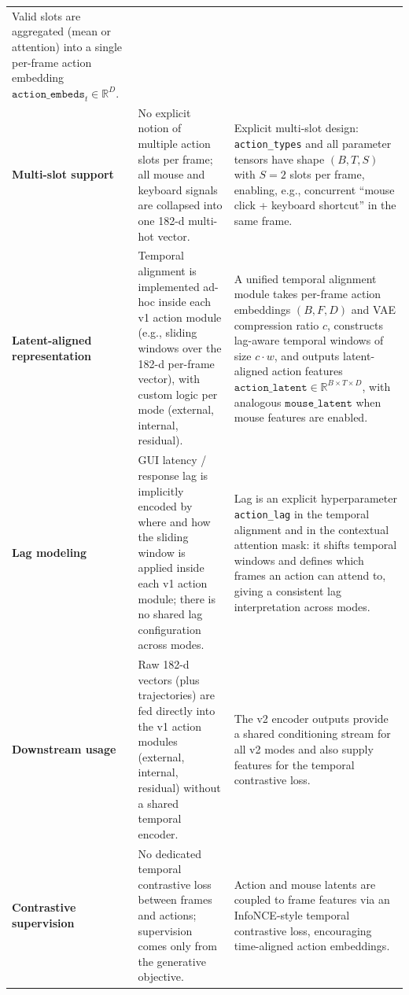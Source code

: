 \begin{table}[h!]
\begin{tabularx}{\linewidth}{p{2.9cm} >{\raggedright\arraybackslash}X >{\raggedright\arraybackslash}X}
    Valid slots are aggregated (mean or attention) into a single
    per-frame action embedding
    $\texttt{action\_embeds}_{t} \in \mathbb{R}^{D}$. \\[2pt]
    \textbf{Multi-slot support} &
    No explicit notion of multiple action slots per frame;
    all mouse and keyboard signals are collapsed into one
    182-d multi-hot vector. &
    Explicit multi-slot design:
    \texttt{action\_types} and all parameter tensors have shape
    $(B, T, S)$ with $S=2$ slots per frame,
    enabling, e.g., concurrent ``mouse click + keyboard shortcut''
    in the same frame. \\[2pt]
    \textbf{Latent-aligned representation} &
    Temporal alignment is implemented ad-hoc inside each
    v1 action module (e.g., sliding windows over the
    182-d per-frame vector),
    with custom logic per mode (external, internal, residual). &
    A unified temporal alignment module takes per-frame action embeddings
    $(B, F, D)$ and VAE compression ratio $c$,
    constructs lag-aware temporal windows of size
    $c \cdot w$,
    and outputs latent-aligned action features
    $\texttt{action\_latent} \in \mathbb{R}^{B \times T \times D}$,
    with analogous $\texttt{mouse\_latent}$ when mouse features are enabled. \\[2pt]
    \textbf{Lag modeling} &
    GUI latency / response lag is implicitly encoded
    by where and how the sliding window is applied
    inside each v1 action module; there is no shared
    lag configuration across modes. &
    Lag is an explicit hyperparameter
    \texttt{action\_lag} in the temporal alignment and in
    the contextual attention mask:
    it shifts temporal windows and defines which frames
    an action can attend to, giving a consistent lag interpretation across modes. \\[2pt]
    \textbf{Downstream usage} &
    Raw 182-d vectors (plus trajectories) are fed directly into the v1 action modules (external, internal, residual) without a shared temporal encoder. &
    The v2 encoder outputs provide a shared conditioning stream for all v2 modes and also supply features for the temporal contrastive loss. \\[2pt]
    \textbf{Contrastive supervision} &
    No dedicated temporal contrastive loss between frames
    and actions; supervision comes only from the generative objective. &
    Action and mouse latents are coupled to frame features via
    an InfoNCE-style temporal contrastive loss, encouraging time-aligned action embeddings. \\
    \bottomrule
  \end{tabularx}
\end{table}

